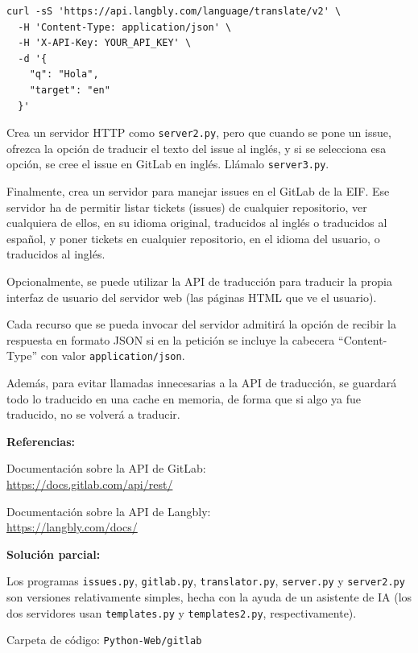 \begin{verbatim}
curl -sS 'https://api.langbly.com/language/translate/v2' \
  -H 'Content-Type: application/json' \
  -H 'X-API-Key: YOUR_API_KEY' \
  -d '{
    "q": "Hola",
    "target": "en"
  }'
\end{verbatim}

Crea un servidor HTTP como \texttt{server2.py}, pero que cuando se pone un issue, ofrezca la opción de traducir el texto del issue al inglés, y si se selecciona esa opción, se cree el issue en GitLab en inglés.  Llámalo \texttt{server3.py}.

Finalmente, crea un servidor para manejar issues en el GitLab de la EIF. Ese servidor ha de permitir listar tickets (issues) de cualquier repositorio, ver cualquiera de ellos, en su idioma original, traducidos al inglés o traducidos al español, y poner tickets en cualquier repositorio, en el idioma del usuario, o traducidos al inglés.

Opcionalmente, se puede utilizar la API de traducción para traducir la propia interfaz de usuario del servidor web (las páginas HTML que ve el usuario).

Cada recurso que se pueda invocar del servidor admitirá la opción de recibir la respuesta en formato JSON si en la petición se incluye la cabecera ``Content-Type'' con valor \texttt{application/json}.

Además, para evitar llamadas innecesarias a la API de traducción, se guardará todo lo traducido en una cache en memoria, de forma que si algo ya fue traducido, no se volverá a traducir.

\textbf{Referencias:}

Documentación sobre la API de GitLab: \\
\url{https://docs.gitlab.com/api/rest/}

Documentación sobre la API de Langbly: \\
\url{https://langbly.com/docs/}

\textbf{Solución parcial:}

Los programas \texttt{issues.py}, \texttt{gitlab.py}, \texttt{translator.py}, \texttt{server.py} y \texttt{server2.py} son versiones relativamente simples, hecha con la ayuda de un asistente de IA (los dos servidores usan \texttt{templates.py} y \texttt{templates2.py}, respectivamente).

Carpeta de código: \texttt{Python-Web/gitlab}


